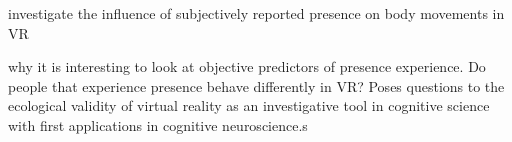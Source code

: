investigate the influence of subjectively reported presence on body movements in VR

why it is interesting to look at objective predictors of presence experience. Do people that experience presence behave differently in VR? Poses questions to the ecological validity of virtual reality as an investigative tool in cognitive science with first applications in cognitive neuroscience.s